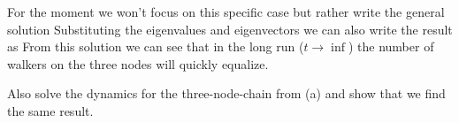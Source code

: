 For the moment we won't focus on this specific case but rather write the general solution
Substituting the eigenvalues and eigenvectors we can also write the result as 
From this solution we can see that in the long run ($t\to \inf$) the number of walkers on the three nodes will quickly equalize.

\subquestion
Also solve the dynamics for the three-node-chain from (a) and show that we find the same result. 

